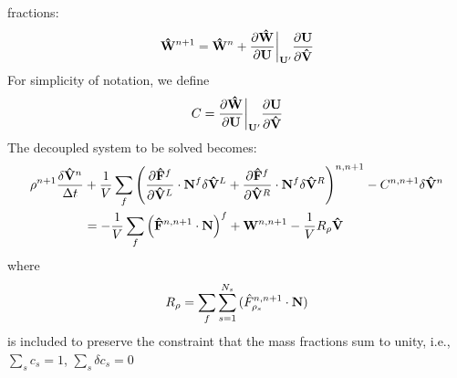 fractions:
\begin{equation} 
  \mathbf{\hat{W}}^{n+1} = \mathbf{\hat{W}}^n + 
  \frac{\partial \mathbf{\hat{W}}}{\partial \mathbf U} \bigg|_{\mathbf U '} 
  \frac{\partial \mathbf U}{\partial \mathbf{\hat{V}}}
  \label{source-term-linearization}
\end{equation}
For simplicity of notation, we define
\begin{equation} 
  C = \frac{\partial \mathbf{\hat{W}}}{\partial \mathbf U} \bigg|_{\mathbf{U}'} \frac{\partial \mathbf U}{\partial \mathbf{\hat{V}}}
  \label{c-source-term}
\end{equation}
The decoupled system to be solved becomes:
\begin{equation} 
  \begin{split}
    \rho^{n+1} \frac{\delta \mathbf{\hat{V}}^n}{\Delta t} &+ \frac{1}{V} 
    \sum\limits_{f}^{}{ \left( \frac{\partial \mathbf{\hat{F}}^f}{\partial \mathbf{\hat{V}}^L} \cdot \mathbf{N}^f \delta \mathbf{\hat{V}}^L 
    + \frac{\partial \mathbf{\hat{F}}^f}{\partial \mathbf{\hat{V}}^R} \cdot \mathbf{N}^f \delta \mathbf{\hat{V}}^R \right)^{n,n+1}} 
    - C^{n,n+1} \delta \mathbf{\hat{V}}^n \\ 
    &= -\frac{1}{V}\sum\limits_{f}^{}{
      \left( \mathbf{\hat{F}}^{n,n+1} \cdot \mathbf{N} \right)^f } 
      + \mathbf{W}^{n, n+1} - \frac{1}{V} R_\rho \mathbf{\hat{V}}
  \end{split}
\end{equation}
where
\begin{equation}
  R_\rho =
  \sum\limits_{f}^{}{\sum\limits_{s=1}^{N_s}{(\hat{F}_{\rho_s}^{n,n+1}\cdot\mathbf{N})}} 
  \label{decoupled-no-scaling}
\end{equation}
is included to preserve the constraint that the mass fractions
sum to unity, i.e., $\sum\limits_{s}{c_s}=1$, $\sum\limits_{s}{\delta c_s}=0$

